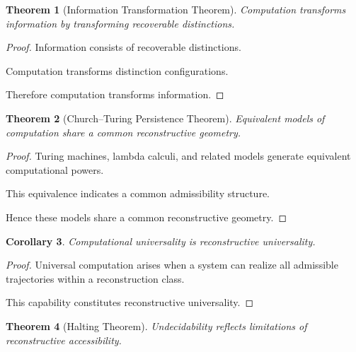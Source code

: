 \documentclass[12pt,oneside]{article}
\newtheorem{theorem}{Theorem}[section] \newtheorem{lemma}[theorem]{Lemma} \newtheorem{proposition}[theorem]{Proposition} \newtheorem{corollary}[theorem]{Corollary}
\theoremstyle{definition}
\begin{document}
\begin{theorem}[Information Transformation Theorem]

Computation transforms information by transforming recoverable distinctions.

\end{theorem}

\begin{proof}

Information consists of recoverable distinctions.

Computation transforms distinction configurations.

Therefore computation transforms information.

\end{proof}

\begin{theorem}[Church--Turing Persistence Theorem]

Equivalent models of computation share a common reconstructive geometry.

\end{theorem}

\begin{proof}

Turing machines, lambda calculi, and related models generate equivalent computational powers.

This equivalence indicates a common admissibility structure.

Hence these models share a common reconstructive geometry.

\end{proof}

\begin{corollary}

Computational universality is reconstructive universality.

\end{corollary}

\begin{proof}

Universal computation arises when a system can realize all admissible trajectories within a reconstruction class.

This capability constitutes reconstructive universality.

\end{proof}

\begin{theorem}[Halting Theorem]

Undecidability reflects limitations of reconstructive accessibility.

\end{theorem}
\end{document}
